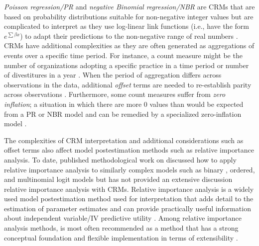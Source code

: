 \documentclass[ShortAfour,times,sageapa]{sagej}
\begin{document}
	\textit{Poisson regression/PR} and \textit{negative Binomial regression/NBR} are CRMs that are based on probability distributions suitable for non-negative integer values but are complicated to interpret as they use log-linear link functions (i.e., have the form $e^{\sum\beta x}$) to adapt their predictions to the non-negative range of real numbers \cite{blevins2015count}.
	CRMs have additional complexities as they are often generated as aggregations of events over a specific time period.
	For instance, a count measure might be the number of organizations adopting a specific practice in a time period \cite{naumovska2021strength} or number of divestitures in a year \cite{bettinazzi2021stakeholder}. 
	When the period of aggregation differs across observations in the data, additional \emph{offset} terms are needed to re-establish parity across observations \cite[see, for an example]{glerum2021trainer}.
	Furthermore, some count measures suffer from \emph{zero inflation}; a situation in which there are more 0 values than would be expected from a PR or NBR model and can be remedied by a specialized zero-inflation model \cite[again see, for an example]{glerum2021trainer}.
	
	The complexities of CRM interpretation and additional considerations such as offset terms also affect model postestimation methods such as relative importance analysis. 
	To date, published methodological work on discussed how to apply relative importance analysis to similarly complex models such as binary \cite{azen2009using}, ordered, and multinomial logit models \cite{luchman2014relative} but has not provided an extensive discussion relative importance analysis with CRMs. 
	Relative importance analysis is a widely used model postestimation method used for interpretation that adds detail to the estimation of parameter estimates and can provide practically useful information about independent variable/IV predictive utility \cite{tonidandel2011relative}.  
	Among relative importance analysis methods, \cite[dominance analysis/DA]{azen2003dominance} is most often recommended as a method that has a strong conceptual foundation \cite{gromping2007estimators} and flexible implementation in terms of extensibility \cite[see]{luchman2021determining}.
	
	
\end{document}
